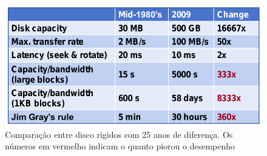 \begin{figure}[H]\centering
  \centerline{\includegraphics[width=\textwidth]{figuras/i0.png}}
  \caption{Comparação entre disco rigidos com 25 anos de diferença. Os números em vermelho indicam o quanto piorou o desempenho}\label{fig:i0}
\end{figure} 


